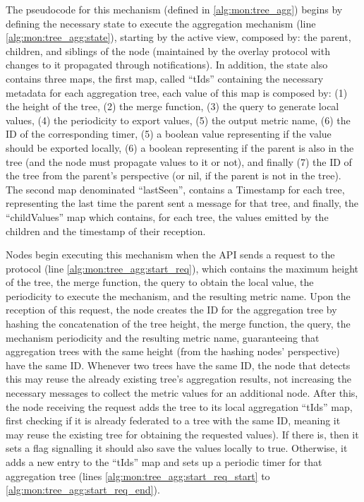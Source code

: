 The pseudocode for this mechanism (defined in \ref{alg:mon:tree_agg}) begins by defining the necessary state to execute the aggregation mechanism (line \ref{alg:mon:tree_agg:state}), starting by the active view, composed by: the parent, children, and siblings of the node (maintained by the overlay protocol with changes to it propagated through notifications). In addition, the state also contains three maps, the first map, called ``tIds'' containing the necessary metadata for each aggregation tree, each value of this map is composed by: (1) the height of the tree, (2) the merge function, (3) the query to generate local values, (4) the periodicity to export values, (5) the output metric name, (6) the ID of the corresponding timer, (5) a boolean value representing if the value should be exported locally, (6) a boolean representing if the parent is also in the tree (and the node must propagate values to it or not), and finally (7) the ID of the tree from the parent's perspective (or nil, if the parent is not in the tree). The second map denominated ``lastSeen'', contains a Timestamp for each tree, representing the last time the parent sent a message for that tree, and finally, the ``childValues'' map which contains, for each tree, the values emitted by the children and the timestamp of their reception.



Nodes begin executing this mechanism when the API sends a request to the protocol (line \ref{alg:mon:tree_agg:start_req}), which contains the maximum height of the tree, the merge function, the query to obtain the local value, the periodicity to execute the mechanism, and the resulting metric name. Upon the reception of this request, the node creates the ID for the aggregation tree by hashing the concatenation of the tree height, the merge function, the query, the mechanism periodicity and the resulting metric name, guaranteeing that aggregation trees with the same height (from the hashing nodes' perspective) have the same ID. Whenever two trees have the same ID, the node that detects this may reuse the already existing tree's aggregation results, not increasing the necessary messages to collect the metric values for an additional node. After this, the node receiving the request adds the tree to its local aggregation ``tIds'' map, first checking if it is already federated to a tree with the same ID, meaning it may reuse the existing tree for obtaining the requested values). If there is, then it sets a flag signalling it should also save the values locally to true. Otherwise, it adds a new entry to the ``tIds'' map and sets up a periodic timer for that aggregation tree (lines \ref{alg:mon:tree_agg:start_req_start} to \ref{alg:mon:tree_agg:start_req_end}).

